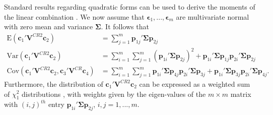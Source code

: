 \documentclass[12pt]{article}\usepackage[]{graphicx}\usepackage[]{color}
\newcommand{\E}{\text{E}}
\newcommand{\Cov}{\text{Cov}}
\newcommand{\Var}{\text{Var}}
\newcommand{\bm}{\mathbf}
\newcommand{\bs}{\boldsymbol}
\begin{document}
Standard results regarding quadratic forms can be used to derive the moments of the linear combination \citep[e.g.,][Sec. 13.5]{Searle2006matrix}. We now assume that $\bs\epsilon_1,...,\bs\epsilon_m$ are multivariate normal with zero mean and variance $\bs\Sigma$. It follows that 
\begin{align}
\label{eq:CRVE_expectation}
\E\left(\bm{c}_1' \bm{V}^{CR2} \bm{c}_2\right) &= \sum_{j=1}^m \bm{p}_{1j}' \bs\Sigma \bm{p}_{2j} \\
\label{eq:CRVE_variance}
\Var\left(\bm{c}_1' \bm{V}^{CR2} \bm{c}_2\right) &= \sum_{i=1}^m \sum_{j=1}^m \left(\bm{p}_{1i}' \bs\Sigma \bm{p}_{2j}\right)^2 + \bm{p}_{1i}' \bs\Sigma \bm{p}_{1j} \bm{p}_{2i}' \bs\Sigma \bm{p}_{2j} \\
\label{eq:CRVE_covariance}
\Cov\left(\bm{c}_1' \bm{V}^{CR2} \bm{c}_2, \bm{c}_3' \bm{V}^{CR} \bm{c}_4\right) &= \sum_{i=1}^m \sum_{j=1}^m \bm{p}_{1i}' \bs\Sigma \bm{p}_{4j} \bm{p}_{2i}' \bs\Sigma \bm{p}_{3j} + \bm{p}_{1i}' \bs\Sigma \bm{p}_{3j} \bm{p}_{2i}' \bs\Sigma \bm{p}_{4j}.
\end{align}
Furthermore, the distribution of $\bm{c}_1' \bm{V}^{CR2} \bm{c}_2$ can be expressed as a weighted sum of $\chi^2_1$ distributions \citep{mathai1992quadratic}, with weights given by the eigen-values of the $m \times m$ matrix with $\left(i,j\right)^{th}$ entry $\bm{p}_{1i}' \bs\Sigma \bm{p}_{2j}$, $i,j=1,...,m$.



\end{document}
